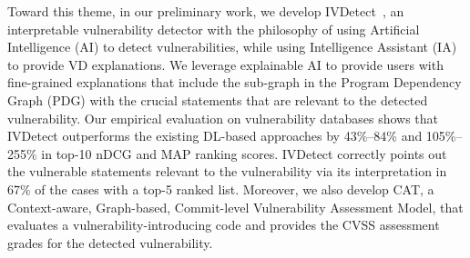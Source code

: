 



Toward this theme, in our preliminary work, we develop
IVDetect~\cite{fse21}, an interpretable vulnerability detector with
the philosophy of using Artificial Intelligence (AI) to detect
vulnerabilities, while using Intelligence Assistant (IA) to provide VD
explanations. We leverage explainable AI to provide users with
fine-grained explanations that include the sub-graph in the Program
Dependency Graph (PDG) with the crucial statements that are relevant
to the detected vulnerability. Our empirical evaluation on
vulnerability databases shows that IVDetect outperforms the existing
DL-based approaches by 43\%–84\% and 105\%–255\% in top-10 nDCG and
MAP ranking scores. IVDetect correctly points out the vulnerable
statements relevant to the vulnerability via its interpretation in
67\% of the cases with a top-5 ranked list. Moreover, we also develop
CAT, a Context-aware, Graph-based, Commit-level Vulnerability
Assessment Model, that evaluates a vulnerability-introducing code and
provides the CVSS assessment grades for the detected vulnerability. 

